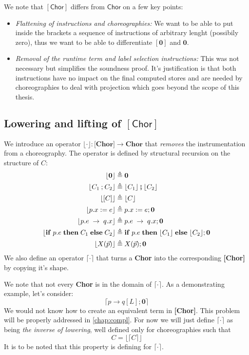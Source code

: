 \documentclass[12pt,a4paper,twoside]{book}
\begin{document}
We note that $\mathsf{[Chor]}$ differs from $\mathsf{Chor}$ on a few key points:
\begin{itemize}
	\item \emph{Flattening of instructions and choreographies:} We want to be able to put inside the brackets a sequence of instructions of arbitrary lenght (possibily zero), thus we want to be able to differentiate $[\boldsymbol{0}]$ and $\boldsymbol{0}$.
	\item \emph{Removal of the runtime term and label selection instructions:} This was not necessary but simplifies the soundness proof. It's justification is that both instructions have no impact on the final computed stores and are needed by choreographies to deal with projection\cite{montesi2023introduction} which goes beyond the scope of this thesis.
\end{itemize}

\subsection{Lowering and lifting of $\mathsf{[Chor]}$}
We introduce an operator $\lfloor \cdot \rfloor: \textbf{[Chor]} \rightarrow \textbf{Chor}$ that \emph{removes} the instrumentation from a choreography. The operator is defined by structural recursion on the structure of $C$:
\begin{align*}
\lfloor \boldsymbol{0}\rfloor & \triangleq \boldsymbol{0} \\
\lfloor C_1 \mathbin{;} C_2\rfloor & \triangleq \lfloor C_1 \rfloor \fatsemi \lfloor C_2 \rfloor\\
\lfloor [C] \rfloor & \triangleq \lfloor C \rfloor\\
	\lfloor p.x \mathrel{:=} e \rfloor & \triangleq p.x \mathrel{:=} e; \boldsymbol{0}\\
	\lfloor p.e \;\rightarrow\; q.x \rfloor & \triangleq p.e \;\rightarrow\; q.x; \boldsymbol{0}\\
\lfloor \mathbf{if}\; p.e\; \mathbf{then}\; C_1\; \mathbf{else}\; C_2 \rfloor
	& \triangleq \mathbf{if}\; p.e\; \mathbf{then}\; \lfloor C_1\rfloor\; \mathbf{else}\; \lfloor C_2 \rfloor; \boldsymbol{0}\\
	\lfloor X(\vec{p})\rfloor & \triangleq X(\vec{p}); \boldsymbol{0}
\end{align*}
We also define an operator $\lceil \cdot \rceil$ that turns a \textbf{Chor} into the corresponding \textbf{[Chor]} by copying it's shape.

We note that not every \textbf{Chor} is in the domain of $\lceil \cdot \rceil$.
As a demonstrating example, let's consider:
$$
\lceil p \rightarrow q[L]; \boldsymbol{0} \rceil
$$
We would not know how to create an equivalent term in \textbf{[Chor]}.
This problem will be properly addressed in \ref{chap:compl}. For now we will just define $\lceil \cdot \rceil$ as being \emph{the inverse of lowering}, well defined only for choreographies such that
\begin{equation}\label{defs:lift_chor}
C = \lfloor \lceil C \rceil \rfloor
\end{equation}
It is to be noted that this property is defining for $\lceil \cdot \rceil$.
\end{document}
